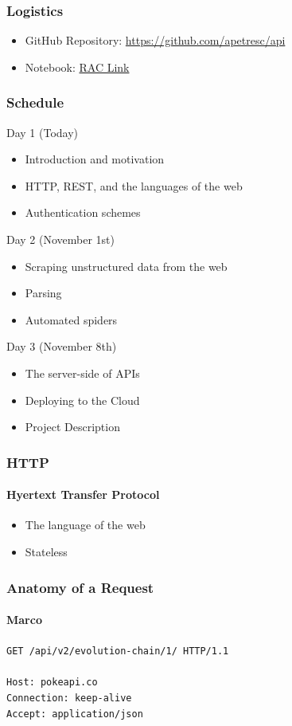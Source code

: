 \documentclass{beamer}
\begin{document}
\begin{frame}
  \frametitle{Logistics}
  
  \begin{itemize}
    \item GitHub Repository: \href{https://github.com/apetresc/api}{https://github.com/apetresc/api}
    \item Notebook: \href{https://rac.rotman.utoronto.ca/jupyter/user/ut_apetrescu/lab/tree/Day1.ipynb}{RAC Link}
  \end{itemize}
\end{frame}


\begin{frame}
  \frametitle{Schedule}
  
  \alert{Day 1 (Today)}
  \begin{itemize}
    \item Introduction and motivation
    \item HTTP, REST, and the languages of the web
    \item Authentication schemes
  \end{itemize}

  Day 2 (November 1st)
  \begin{itemize}
    \item Scraping unstructured data from the web
    \item Parsing 
    \item Automated spiders
  \end{itemize}

  Day 3 (November 8th)
  \begin{itemize}
    \item The server-side of APIs
    \item Deploying to the Cloud
    \item Project Description
  \end{itemize}
\end{frame}


\begin{frame}
  \frametitle{HTTP}
  \framesubtitle{Hyertext Transfer Protocol}
  \begin{itemize}
    \item The language of the web
    \item Stateless
  \end{itemize}
\end{frame}


\begin{frame}
  \frametitle{Anatomy of a Request}
  \framesubtitle{Marco}
  \texttt{{\color{red}GET} {\color{darkgreen}/api/v2/evolution-chain/1/} {\color{blue}HTTP/1.1}}
  \pause
  \\
  \bigskip
  \\
  {
    \color{olive}
    \texttt{Host: pokeapi.co} \\
    \texttt{Connection: keep-alive} \\
    \texttt{Accept: application/json}
  }
\end{frame}
\end{document}
